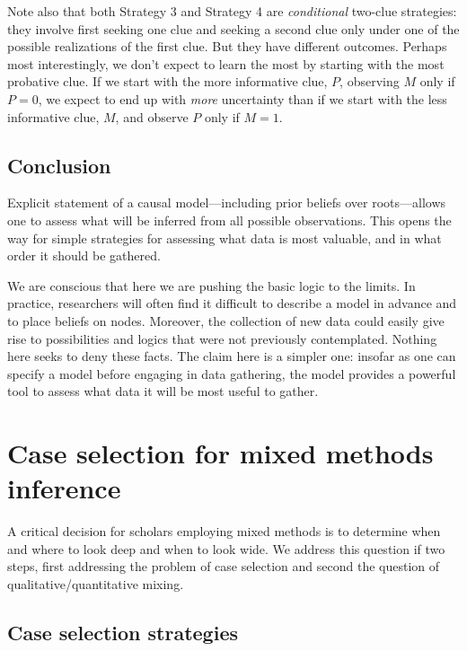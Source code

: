 \documentclass[
  12pt,
]{book}
\begin{document}
Note also that both Strategy 3 and Strategy 4 are \emph{conditional} two-clue strategies: they involve first seeking one clue and seeking a second clue only under one of the possible realizations of the first clue. But they have different outcomes. Perhaps most interestingly, we don't expect to learn the most by starting with the most probative clue. If we start with the more informative clue, \(P\), observing \(M\) only if \(P=0\), we expect to end up with \emph{more} uncertainty than if we start with the less informative clue, \(M\), and observe \(P\) only if \(M=1\).

\hypertarget{conclusion}{%
\section{Conclusion}\label{conclusion}}

Explicit statement of a causal model---including prior beliefs over roots---allows one to assess what will be inferred from all possible observations. This opens the way for simple strategies for assessing what data is most valuable, and in what order it should be gathered.

We are conscious that here we are pushing the basic logic to the limits. In practice, researchers will often find it difficult to describe a model in advance and to place beliefs on nodes. Moreover, the collection of new data could easily give rise to possibilities and logics that were not previously contemplated. Nothing here seeks to deny these facts. The claim here is a simpler one: insofar as one can specify a model before engaging in data gathering, the model provides a powerful tool to assess what data it will be most useful to gather.

\hypertarget{caseselection}{%
\chapter{Case selection for mixed methods inference}\label{caseselection}}

A critical decision for scholars employing mixed methods is to determine when and where to look deep and when to look wide. We address this question if two steps, first addressing the problem of case selection and second the question of qualitative/quantitative mixing.

\hypertarget{case-selection-strategies}{%
\section{Case selection strategies}\label{case-selection-strategies}}
\end{document}
